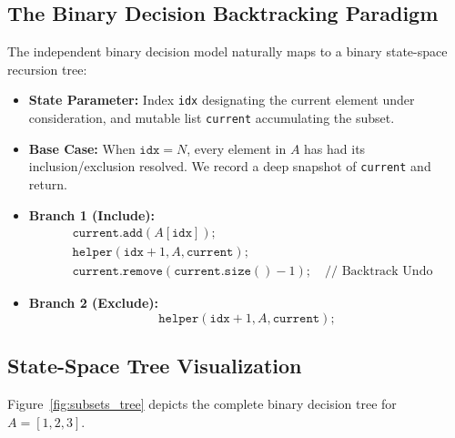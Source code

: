 \documentclass[10pt,journal,compsoc,onecolumn]{IEEEtran}
\begin{document}
\subsection{The Binary Decision Backtracking Paradigm}
The independent binary decision model naturally maps to a binary state-space recursion tree:
\begin{itemize}
    \item \textbf{State Parameter:} Index \texttt{idx} designating the current element under consideration, and mutable list \texttt{current} accumulating the subset.
    \item \textbf{Base Case:} When $\texttt{idx} = N$, every element in $A$ has had its inclusion/exclusion resolved. We record a deep snapshot of \texttt{current} and return.
    \item \textbf{Branch 1 (Include):}
    \begin{align*}
        &\texttt{current.add}(A[\texttt{idx}]); \\
        &\texttt{helper}(\texttt{idx} + 1, A, \texttt{current}); \\
        &\texttt{current.remove}(\texttt{current.size}() - 1); \quad \text{// Backtrack Undo}
    \end{align*}
    \item \textbf{Branch 2 (Exclude):}
    \begin{equation*}
        \texttt{helper}(\texttt{idx} + 1, A, \texttt{current});
    \end{equation*}
\end{itemize}

\subsection{State-Space Tree Visualization}
Figure~\ref{fig:subsets_tree} depicts the complete binary decision tree for $A = [1, 2, 3]$.
\end{document}
